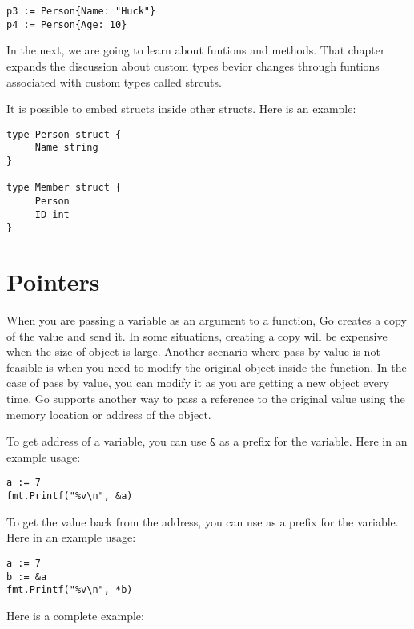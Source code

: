 \begin{lstlisting}[numbers=none]
p3 := Person{Name: "Huck"}
p4 := Person{Age: 10}
\end{lstlisting}

In the next, we are going to learn about funtions and methods.  That
chapter expands the discussion about custom types bevior changes
through funtions associated with custom types called strcuts.

It is possible to embed structs inside other
structs.  Here is an example:

\begin{lstlisting}[numbers=none]
type Person struct {
     Name string
}

type Member struct {
     Person
     ID int
}
\end{lstlisting}

\section{Pointers}

When you are passing a variable as an argument to a function, Go
creates a copy of the value and send it.  In some situations, creating
a copy will be expensive when the size of object is large.  Another
scenario where pass by value is not feasible is when you need to
modify the original object inside the function.  In the case of pass
by value, you can modify it as you are getting a new object every
time.  Go supports another way to pass a reference to the original
value using the memory location or address of the
object.

To get address of a variable, you can use \texttt{\&} as a prefix for
the variable.  Here in an example usage:

\begin{lstlisting}[numbers=none]
a := 7
fmt.Printf("%v\n", &a)
\end{lstlisting}

To get the value back from the address, you can use \texttt{\*} as a
prefix for the variable.  Here in an example usage:

\begin{lstlisting}[numbers=none]
a := 7
b := &a
fmt.Printf("%v\n", *b)
\end{lstlisting}

Here is a complete example:



